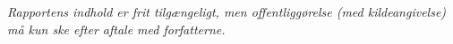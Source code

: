 \begin{adjustwidth*}{-1.6cm}{-1cm}
\begin{nopagebreak}
{				
				
				\textsl{Rapportens indhold er frit tilgængeligt, men offentliggørelse (med kildeangivelse) må kun ske efter aftale med forfatterne.}
				
				
			}
		\end{nopagebreak}
	\end{adjustwidth*}
